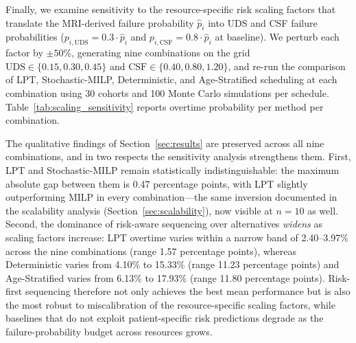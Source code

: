 \documentclass[11pt,a4paper]{article}
\begin{document}
Finally, we examine sensitivity to the resource-specific risk scaling factors that translate the MRI-derived failure probability $\hat{p}_i$ into UDS and CSF failure probabilities ($p_{i,\text{UDS}} = 0.3 \cdot \hat{p}_i$ and $p_{i,\text{CSF}} = 0.8 \cdot \hat{p}_i$ at baseline). We perturb each factor by $\pm 50\%$, generating nine combinations on the grid $\text{UDS} \in \{0.15, 0.30, 0.45\}$ and $\text{CSF} \in \{0.40, 0.80, 1.20\}$, and re-run the comparison of LPT, Stochastic-MILP, Deterministic, and Age-Stratified scheduling at each combination using 30 cohorts and 100 Monte Carlo simulations per schedule. Table~\ref{tab:scaling_sensitivity} reports overtime probability per method per combination.

The qualitative findings of Section~\ref{sec:results} are preserved across all nine combinations, and in two respects the sensitivity analysis strengthens them. First, LPT and Stochastic-MILP remain statistically indistinguishable: the maximum absolute gap between them is 0.47 percentage points, with LPT slightly outperforming MILP in every combination---the same inversion documented in the scalability analysis (Section~\ref{sec:scalability}), now visible at $n=10$ as well. Second, the dominance of risk-aware sequencing over alternatives \emph{widens} as scaling factors increase: LPT overtime varies within a narrow band of 2.40--3.97\% across the nine combinations (range 1.57 percentage points), whereas Deterministic varies from 4.10\% to 15.33\% (range 11.23 percentage points) and Age-Stratified varies from 6.13\% to 17.93\% (range 11.80 percentage points). Risk-first sequencing therefore not only achieves the best mean performance but is also the most robust to miscalibration of the resource-specific scaling factors, while baselines that do not exploit patient-specific risk predictions degrade as the failure-probability budget across resources grows.
\end{document}
